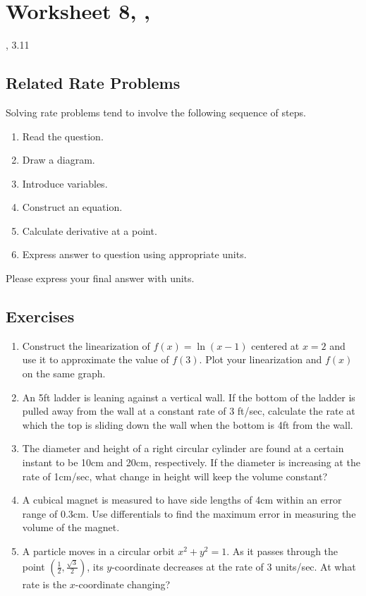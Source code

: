 \newpage\section*{Worksheet 8, \Course, \Semester} 
\noindent {}, 3.11

\subsection*{Related Rate Problems}

    Solving rate problems tend to involve the following sequence of steps.
    \begin{enumerate}
        \item Read the question.
        \item Draw a diagram.
        \item Introduce variables.
        \item Construct an equation.
        \item Calculate derivative at a point.
        \item Express answer to question using appropriate units. 
    \end{enumerate}
    Please express your final answer with units. 
    
    
\subsection*{Exercises}

\begin{enumerate}
	\item Construct the linearization of $f(x) = \ln(x-1)$ centered at $x=2$ and use it to approximate the value of $f(3)$. Plot your linearization and $f(x)$ on the same graph.
    
	\item An 5ft ladder is leaning against a vertical wall. If the bottom of the ladder is pulled away from the wall at a constant rate of 3 ft/sec, calculate the rate at which the top is sliding down the wall when the bottom is 4ft from the wall. 

	\item The diameter and height of a right circular cylinder are found at a certain instant to be 10cm and 20cm, respectively. If the diameter is increasing at the rate of 1cm/sec, what change in height will keep the volume constant?

	\item A cubical magnet is measured to have side lengths of 4cm within an error range of 0.3cm. Use differentials to find the maximum error in measuring the volume of the magnet. 

	\item A particle moves in a circular orbit $x^2+y^2=1$. As it passes through the point $\left(\frac{1}{2},\frac{\sqrt{3}}{2}\right)$, its $y$-coordinate decreases at the rate of 3 units/sec. At what rate is the $x$-coordinate changing? 

\end{enumerate}